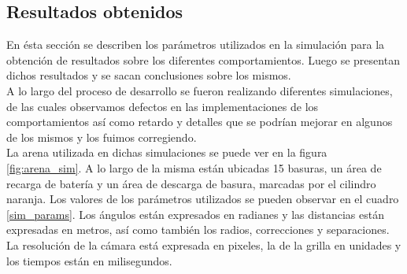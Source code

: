 \subsection{Resultados obtenidos}
\label{results}
En \'esta secci\'on se describen los par\'ametros utilizados en la
simulaci\'on para la obtenci\'on de resultados sobre los diferentes
comportamientos. Luego se presentan dichos resultados y se sacan
conclusiones sobre los mismos.
\\
A lo largo del proceso de desarrollo se fueron realizando diferentes
simulaciones, de las cuales observamos defectos en las implementaciones de los
comportamientos as\'i como retardo y detalles que se podr\'ian mejorar en
algunos de los mismos y los fuimos corregiendo. \\
La arena utilizada en dichas simulaciones se puede ver en la figura
\ref{fig:arena_sim}. A lo largo de la misma est\'an ubicadas 15 basuras,
un \'area de recarga de bater\'ia y un \'area de descarga de basura, marcadas
por el cilindro naranja. Los valores de los par\'ametros utilizados se pueden
observar en el cuadro \ref{sim_params}. Los \'angulos est\'an expresados en
radianes y las distancias est\'an expresadas en metros, as\'i como tambi\'en
los radios, correcciones y separaciones. La resoluci\'on de la c\'amara est\'a
expresada en pixeles, la de la grilla en unidades y los tiempos est\'an en 
milisegundos.
